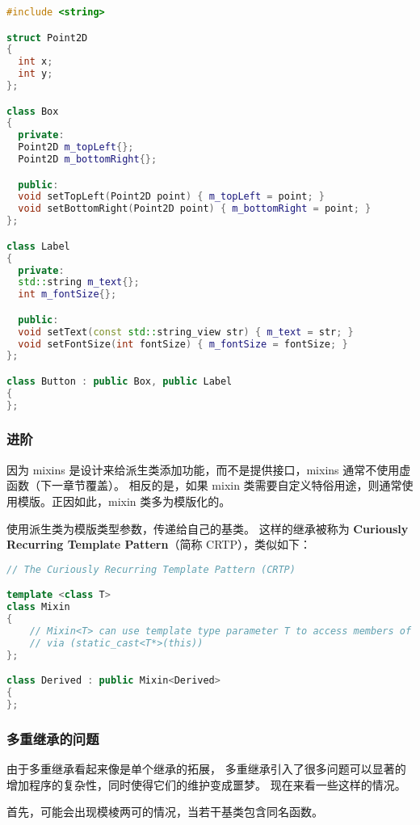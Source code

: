 \documentclass[../../LearnCpp.tex]{subfiles}
\begin{document}
\begin{lstlisting}[language=C++]
#include <string>

struct Point2D
{
  int x;
  int y;
};

class Box
{
  private:
  Point2D m_topLeft{};
  Point2D m_bottomRight{};

  public:
  void setTopLeft(Point2D point) { m_topLeft = point; }
  void setBottomRight(Point2D point) { m_bottomRight = point; }
};

class Label
{
  private:
  std::string m_text{};
  int m_fontSize{};

  public:
  void setText(const std::string_view str) { m_text = str; }
  void setFontSize(int fontSize) { m_fontSize = fontSize; }
};

class Button : public Box, public Label
{
};
\end{lstlisting}

\subsubsection*{进阶}

因为 mixins 是设计来给派生类添加功能，而不是提供接口，mixins 通常不使用虚函数（下一章节覆盖）。
相反的是，如果 mixin 类需要自定义特俗用途，则通常使用模版。正因如此，mixin 类多为模版化的。

使用派生类为模版类型参数，传递给自己的基类。
这样的继承被称为 \textbf{Curiously Recurring Template Pattern}（简称 CRTP），类似如下：

\begin{lstlisting}[language=C++]
// The Curiously Recurring Template Pattern (CRTP)

template <class T>
class Mixin
{
    // Mixin<T> can use template type parameter T to access members of Derived
    // via (static_cast<T*>(this))
};

class Derived : public Mixin<Derived>
{
};
\end{lstlisting}

\subsubsection*{多重继承的问题}

由于多重继承看起来像是单个继承的拓展，
多重继承引入了很多问题可以显著的增加程序的复杂性，同时使得它们的维护变成噩梦。
现在来看一些这样的情况。

首先，可能会出现模棱两可的情况，当若干基类包含同名函数。
\end{document}
